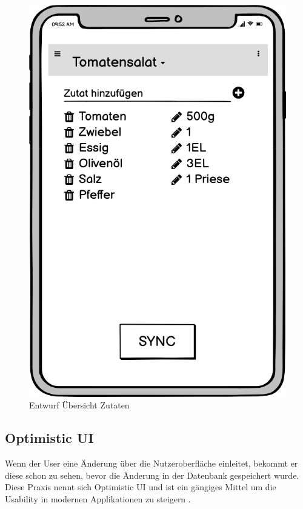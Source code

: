 \documentclass[a4paper, 12pt]{scrreprt}
\begin{document}
\begin{figure}[H]
\begin{minipage}{.45\textwidth}
		\includegraphics[width=1\textwidth]{wireframeZutaten2.png}
		\caption{Entwurf Übersicht Zutaten}
		\label{fig:zutatenFrame}
	\end{minipage}
\end{figure}

\subsection{Optimistic UI}
\label{sec:optimisticUI}
Wenn der User eine Änderung über die Nutzeroberfläche einleitet, bekommt er diese schon zu sehen, bevor die Änderung in der Datenbank gespeichert wurde. Diese Praxis nennt sich Optimistic UI und ist ein gängiges Mittel um die Usability in modernen Applikationen zu steigern \autocite{ArticleOptimisticUI}.
\end{document}
